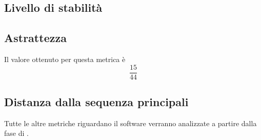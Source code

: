 \subsection{Livello di stabilità}


\subsection{Astrattezza}

Il valore ottenuto per questa metrica è 
\begin{displaymath}
	\frac{15}{44}
\end{displaymath}

\subsection{Distanza dalla sequenza principali}

Tutte le altre metriche riguardano il software verranno analizzate a partire dalla fase di \COD.
